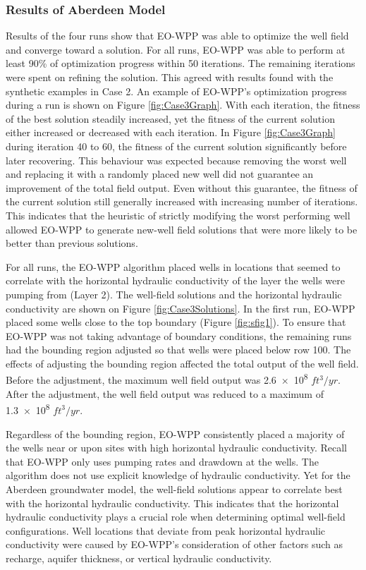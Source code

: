 \documentclass[authoryear]{elsarticle}
\begin{document}
\subsubsection{Results of Aberdeen Model}
Results of the four runs show that EO-WPP was able to optimize the well field and converge toward a solution. For all runs, EO-WPP was able to perform at least 90\% of optimization progress within 50 iterations. The remaining iterations were spent on refining the solution. This agreed with results found with the synthetic examples in Case 2. An example of EO-WPP's optimization progress during a run is shown on Figure \ref{fig:Case3Graph}. With each iteration, the fitness of the best solution steadily increased, yet the fitness of the current solution either increased or decreased with each iteration. In Figure \ref{fig:Case3Graph} during iteration 40 to 60, the fitness of the current solution  significantly before later recovering. This behaviour was expected because removing the worst well and replacing it with a randomly placed new well did not guarantee an improvement of the total field output. Even without this guarantee, the fitness of the current solution still generally increased with increasing number of iterations. This indicates that the heuristic of strictly modifying the worst performing well allowed EO-WPP to generate new-well field solutions that were more likely to be better than previous solutions.

For all runs, the EO-WPP algorithm placed wells in locations that seemed to correlate with the horizontal hydraulic conductivity of the layer the wells were pumping from (Layer 2). The well-field solutions and the horizontal hydraulic conductivity are shown on Figure \ref{fig:Case3Solutions}. In the first run, EO-WPP placed some wells close to the top boundary (Figure \ref{fig:sfig1}). To ensure that EO-WPP was not taking advantage of boundary conditions, the remaining runs had the bounding region adjusted so that wells were placed below row 100. The effects of adjusting the bounding region affected the total output of the well field. Before the adjustment, the maximum well field output was \num{2.6e8} $ft^{3}/yr$. After the adjustment, the well field output was reduced to a maximum of \num{1.3e8} $ft^{3}/yr$.

Regardless of the bounding region, EO-WPP consistently placed a majority of the wells near or upon sites with high horizontal hydraulic conductivity. Recall that EO-WPP only uses pumping rates and drawdown at the wells. The algorithm does not use explicit knowledge of hydraulic conductivity. Yet for the Aberdeen groundwater model, the well-field solutions appear to correlate best with the horizontal hydraulic conductivity. This indicates that the horizontal hydraulic conductivity plays a crucial role when determining optimal well-field configurations. Well locations that deviate from peak horizontal hydraulic conductivity were caused by EO-WPP's consideration of other factors such as recharge, aquifer thickness, or vertical hydraulic conductivity.
\end{document}
